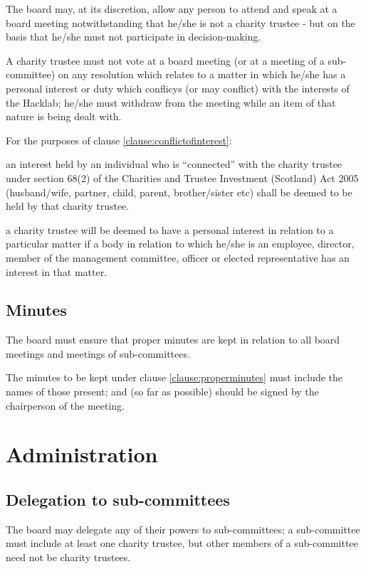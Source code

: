 \documentclass{article}
\newcommand{\charityact}{Charities and Trustee Investment (Scotland) Act 2005}
\begin{document}
\clause The board may, at its discretion, allow any person to attend
and speak at a board meeting notwithstanding that he/she is not a
charity trustee - but on the basis that he/she must not participate in
decision-making.

\clause\label{clause:conflictofinterest}A charity trustee must not
vote at a board meeting (or at a meeting of a sub-committee) on any
resolution which relates to a matter in which he/she has a personal
interest or duty which conflicys (or may conflict) with the interests
of the Hacklab; he/she must withdraw from the meeting while an item of
that nature is being dealt with.

\clause For the purposes of clause \ref{clause:conflictofinterest}:

\subclause an interest held by an individual who is ``connected'' with
the charity trustee under section 68(2) of the \charityact
(husband/wife, partner, child, parent, brother/sister etc) shall be
deemed to be held by that charity trustee.

\subclause a charity trustee will be deemed to have a personal
interest in relation to a particular matter if a body in relation to
which he/she is an employee, director, member of the management
committee, officer or elected representative has an interest in that
matter.

\subsection{Minutes}

\clause\label{clause:properminutes}The board must ensure that proper
minutes are kept in relation to all board meetings and meetings of
sub-committees.

\clause The minutes to be kept under clause \ref{clause:properminutes}
must include the names of those present; and (so far as possible)
should be signed by the chairperson of the meeting.

\section{Administration}

\subsection{Delegation to sub-committees}

\clause\label{clause:delegation}The board may delegate any of their
powers to sub-committees; a sub-committee must include at least one
charity trustee, but other members of a sub-committee need not be
charity trustees.
\end{document}
